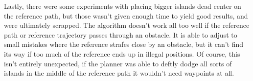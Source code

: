 


Lastly, there were some experiments with placing bigger islands dead center on the reference path, but those wasn't given enough time to yield good results, 
and were ultimately scrapped. The algorithm doesn't work all too well if the reference path or reference trajectory passes through an obstacle. 
It is able to adjust to small mistakes where the reference strafes close by an obstacle, but it can't find its way if too much of the reference ends up in illegal positions.
Of course, this isn't entirely unexpected, if the planner was able to deftly dodge all sorts of islands in the middle of the reference path it wouldn't need waypoints at all.


